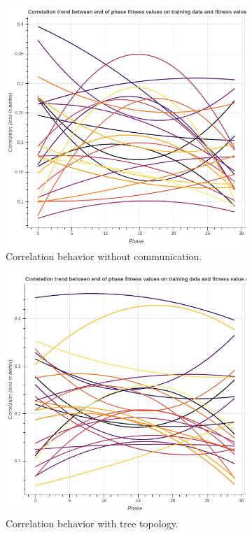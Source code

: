 \begin{figure}
    \begin{subfigure}{0.5\textwidth}
        \includegraphics[width=0.8\linewidth]{figures/usecasecorrdisconnected.png}
        \caption{Correlation behavior without communication.}
    \end{subfigure}
    \begin{subfigure}{0.5\textwidth}
        \includegraphics[width=0.8\linewidth]{figures/usecasecorrtree.png}
        \caption{Correlation behavior with tree topology.}
    \end{subfigure}
        \begin{subfigure}{0.5\textwidth}

\end{subfigure}
\end{figure}
